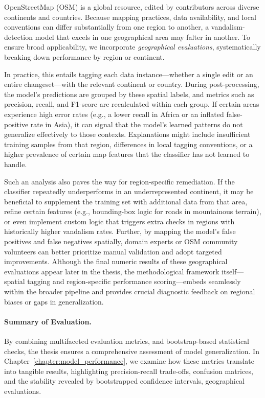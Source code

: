 \documentclass[
    13pt, %
    a4paper, %
    DIV14, %
    listof=totoc, %
    bibliography=totoc, %
    index=totoc, %
    headsepline
]{scrreprt}
\begin{document}
OpenStreetMap (OSM) is a global resource, edited by contributors across diverse continents and countries. Because mapping practices, data availability, and local conventions can differ substantially from one region to another, a vandalism-detection model that excels in one geographical area may falter in another. To ensure broad applicability, we incorporate \emph{geographical evaluations}, systematically breaking down performance by region or continent.

In practice, this entails tagging each data instance—whether a single edit or an entire changeset—with the relevant continent or country. During post-processing, the model’s predictions are grouped by these spatial labels, and metrics such as precision, recall, and F1-score are recalculated within each group. If certain areas experience high error rates (e.g., a lower recall in Africa or an inflated false-positive rate in Asia), it can signal that the model’s learned patterns do not generalize effectively to those contexts. Explanations might include insufficient training samples from that region, differences in local tagging conventions, or a higher prevalence of certain map features that the classifier has not learned to handle.

Such an analysis also paves the way for region-specific remediation. If the classifier repeatedly underperforms in an underrepresented continent, it may be beneficial to supplement the training set with additional data from that area, refine certain features (e.g., bounding-box logic for roads in mountainous terrain), or even implement custom logic that triggers extra checks in regions with historically higher vandalism rates. Further, by mapping the model’s false positives and false negatives spatially, domain experts or OSM community volunteers can better prioritize manual validation and adopt targeted improvements. Although the final numeric results of these geographical evaluations appear later in the thesis, the methodological framework itself—spatial tagging and region-specific performance scoring—embeds seamlessly within the broader pipeline and provides crucial diagnostic feedback on regional biases or gaps in generalization.

\paragraph{Summary of Evaluation.}
By combining multifaceted evaluation metrics, and bootstrap-based statistical checks, the thesis ensures a comprehensive assessment of model generalization. In Chapter~\ref{chapter:model_performance}, we examine how these metrics translate into tangible results, highlighting precision-recall trade-offs, confusion matrices, and the stability revealed by bootstrapped confidence intervals, geographical evaluations.
\end{document}
